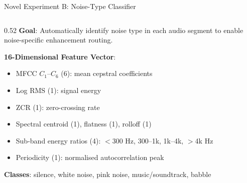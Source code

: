 \documentclass[aspectratio=169]{beamer}
\begin{document}
\begin{frame}{Novel Experiment B: Noise-Type Classifier}
  \begin{columns}[T]
    \begin{column}{0.52\textwidth}
      \textbf{Goal}: Automatically identify noise type in each audio segment to enable noise-specific enhancement routing.

      \vspace{0.2cm}
      \textbf{16-Dimensional Feature Vector}:
      \begin{itemize}
        \item MFCC $C_1$--$C_6$ (6): mean cepstral coefficients
        \item Log RMS (1): signal energy
        \item ZCR (1): zero-crossing rate
        \item Spectral centroid (1), flatness (1), rolloff (1)
        \item Sub-band energy ratios (4): $<$300 Hz, 300--1k, 1k--4k, $>$4k Hz
        \item Periodicity (1): normalised autocorrelation peak
      \end{itemize}

      \vspace{0.2cm}
      \textbf{Classes}: silence, white noise, pink noise, music/soundtrack, babble


\end{column}
\end{columns}
\end{frame}
\end{document}
